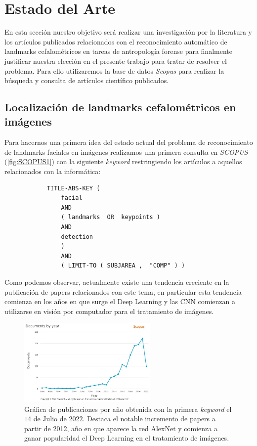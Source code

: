 
\chapter{Estado del Arte}

    \noindent En esta sección nuestro objetivo será realizar una investigación por la literatura y los artículos publicados relacionados con el reconocimiento automático de landmarks cefalométricos en tareas de antropología forense para finalmente justificar nuestra elección en el presente trabajo para tratar de resolver el problema. Para ello utilizaremos la base de datos \textit{Scopus} para realizar la búsqueda y consulta de artículos científico publicados.

    \section{Localización de landmarks cefalométricos en imágenes}

        \noindent Para hacernos una primera idea del estado actual del problema de reconocimiento de landmarks faciales en imágenes realizamos una primera consulta en \textit{SCOPUS} (\autoref{fig:SCOPUS1}) con la siguiente \textit{keyword} restringiendo los artículos a aquellos relacionados con la informática:
        
        \begin{verbatim}
            TITLE-ABS-KEY ( 
                facial  
                AND  
                ( landmarks  OR  keypoints )  
                AND  
                detection 
                )  
                AND  
                ( LIMIT-TO ( SUBJAREA ,  "COMP" ) )
        \end{verbatim}
        
        \medskip
        
        \noindent Como podemos observar, actualmente existe una tendencia creciente en la publicación de papers relacionados con este tema, en particular esta tendencia comienza en los años en que surge el Deep Learning y las CNN comienzan a utilizarse en visión por computador para el tratamiento de imágenes. 

        \begin{figure}[htpb]
            \centering
            \includegraphics[width=0.6\textwidth]{img/Scopus_1.jpg}
            \caption{Gráfica de publicaciones por año obtenida con la primera \textit{keyword} el $14$ de Julio de $2022$. Destaca el notable incremento de papers a partir de 2012, año en que aparece la red AlexNet y comienza a ganar popularidad el Deep Learning en el tratamiento de imágenes.}
            \label{fig:SCOPUS1}
        \end{figure}

